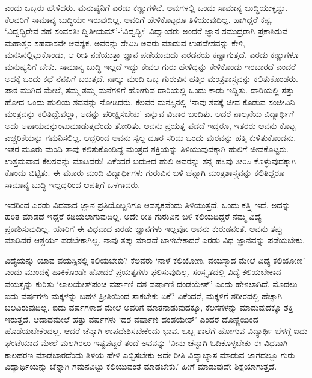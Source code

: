 ಎಂದು ಒಬ್ಬರು ಹೇಳಿದರು. 
ಮನುಷ್ಯನಿಗೆ ಎರಡು 
ಕಣ್ಣುಗಳಿವೆ. ಅವುಗಳಲ್ಲಿ 
ಒಂದು ಸಾಮಾನ್ಯ 
ಬುದ್ಧಿಯುಳ್ಳದ್ದು. ಕೆಲವರಿಗೆ 
ಸಾಮಾನ್ಯ ಬುದ್ಧಿಯೇ 
ಇರುವುದಿಲ್ಲ. ಅವರಿಗೆ 
ಹೇಳಿಕೊಟ್ಟರೂ 
ತಿಳಿಯುವುದಿಲ್ಲ. ಹಾಗಿದ್ದರೆ 
ಕಷ್ಟ. `ವಿದ್ವದ್ಭಿರೇವ ಸಹ 
ಸಂವಸತಿಃ 
ದ್ವಿತೀಯಮ್'-`ವಿದ್ವದ್ಭಿಃ' 
ವಿದ್ವಾಂಸರು ಅಂದರೆ ಜ್ಞಾನ 
ಸಮುದ್ರರಾಗಿ ಪ್ರಕಾಶಿಸುವ 
ಮಹಾತ್ಮರ ಸಹವಾಸವೇ ಆವಶ್ಯಕ. 
ಅವರನ್ನು ಸೇವಿಸಿ ಅವರು ಮಾಡುವ 
ಉಪದೇಶವನ್ನು ಕೇಳಿ, 
ಮನಸಿನಲ್ಲಿಟ್ಟುಕೊಂಡು, ಆ 
ರೀತಿ ನಡೆಯುತ್ತಾ ಜ್ಞಾನ 
ಪಡೆಯುವುದು ಎರಡನೆಯ 
ಕಣ್ಣಾಗುತ್ತದೆ. ಎರಡು 
ಕಣ್ಣುಗಳೂ ಮನುಷ್ಯನಿಗೆ ಬೇಕು. 
ಸಾಮಾನ್ಯ ಬುದ್ಧಿ ಇಲ್ಲದೆ 
ಇದ್ದು ಕೇವಲ ಗುರು 
ಹೇಳಿದ್ದನ್ನು ಕೇಳಿಕೊಂಡು 
ಇರಬಾರದೆ ಎಂದರೆ ಅದಕ್ಕೆ ಒಂದು 
ಕಥೆ ನೆನಪಿಗೆ ಬರುತ್ತದೆ. 
ನಾಲ್ಕು ಮಂದಿ ಒಬ್ಬ ಗುರುವಿನ 
ಹತ್ತಿರ ಮಂತ್ರಶಾಸ್ತ್ರವನ್ನು 
ಕಲಿತುಕೊಂಡರು. ಪಾಠ ಮುಗಿದ 
ಮೇಲೆ, ತಮ್ಮ ತಮ್ಮ ಮನೆಗಳಿಗೆ 
ಹೋಗುವ ದಾರಿಯಲ್ಲಿ ಒಂದು ಕಾಡು 
ಇದ್ದಿತು. ದಾರಿಯಲ್ಲಿ ಸತ್ತು 
ಹೋದ ಒಂದು ಹುಲಿಯ ಶವವನ್ನು 
ನೋಡಿದರು. ಕೆಲವರ 
ಮನಸ್ಸಿನಲ್ಲಿ `ನಾವು ಶವಕ್ಕೆ 
ಜೀವ ಕೊಡುವ ಸಂಜೀವಿನಿ 
ಮಂತ್ರವನ್ನು 
ಕಲಿತಿದ್ದೇವಲ್ಲಾ, ಅದನ್ನು 
ಪರೀಕ್ಷಿಸಬೇಕು' ಎನ್ನುವ 
ವಿಚಾರ ಬಂದಿತು. ಆದರೆ 
ನಾಲ್ಕನೆಯ ವಿದ್ಯಾರ್ಥಿಗೆ ಅದು 
ಅಪಾಯವನ್ನುಂಟುಮಾಡುತ್ತದೆಂದು ತೋರಿತು. ಅವನು ಪ್ರಯತ್ನ ಪಡದೆ ಇದ್ದರೂ, ಇತರರು ಅವನು ಕೊಟ್ಟ ಎಚ್ಚರಿಕೆಯನ್ನು ಗಮನಿಸಲಿಲ್ಲ. ಆದ್ದರಿಂದ ಅವನು ಸ್ವಲ್ಪ ದೂರ ಸರಿದು ಒಂದು ಮರವನ್ನು ಹತ್ತಿ ಕುಳಿತುಕೊಂಡನು. ಇತರ ಮೂರು ಮಂದಿ ತಾವು ಕಲಿತುಕೊಂಡಿದ್ದ ಮಂತ್ರದ ಶಕ್ತಿಯನ್ನು ತಿಳಿಯುವುದಕ್ಕಾಗಿ ಹುಲಿಗೆ ಜೀವಕೊಟ್ಟರು. ಉತ್ತಮವಾದ ಕೆಲಸವನ್ನು ಮಾಡಿದರು! ಏಕೆಂದರೆ ಬದುಕಿದ ಹುಲಿ ಅವರನ್ನು ತನ್ನ ಹಸಿವು ತೀರಿಸಿ ಕೊಳ್ಳುವುದಕ್ಕಾಗಿ ಕೊಂದು ಬಿಟ್ಟಿತು. ಈ ಮೂರು ಮಂದಿ ವಿದ್ಯಾರ್ಥಿಗಳು ಗುರುವಿನ ಬಳಿ ಚೆನ್ನಾಗಿ ಮಂತ್ರಶಾಸ್ತ್ರವನ್ನು ಕಲಿತಿದ್ದರೂ ಸಾಮಾನ್ಯ ಬುದ್ಧಿ ಇಲ್ಲದ್ದರಿಂದ ಆಪತ್ತಿಗೆ ಒಳಗಾದರು. 

ಇದರಿಂದ ಎರಡು ವಿಧವಾದ ಜ್ಞಾನ 
ಪ್ರತಿಯೊಬ್ಬನಿಗೂ 
ಆವಶ್ಯಕವೆಂದು ತಿಳಿಯುತ್ತದೆ. 
ಒಂದು ಕತ್ತ್ತಿ ಇದೆ. ಅದನ್ನು 
ಹರಿತ ಮಾಡದೆ ಇದ್ದರೆ 
ಕಡಿಯಲಾಗುವುದಿಲ್ಲ. ಅದೇ ರೀತಿ 
ಗುರುವಿನ ಬಳಿ ಕಲಿಯದಿದ್ದರೆ 
ನಮ್ಮ ವಿದ್ಯೆ 
ಪ್ರಕಾಶಿಸುವುದಿಲ್ಲ. ಯಾರಿಗೆ 
ಈ ವಿಧವಾದ ಎರಡು ಜ್ಞಾನಗಳು 
ಇಲ್ಲವೋ ಅವನು ಕುರುಡನಂತೆ. 
ಅವನು ತಪ್ಪು ಮಾಡಿದರೆ 
ಆಶ್ಚರ್ಯ ಪಡಬೇಕಾಗಿಲ್ಲ. ನಾವು 
ತಪ್ಪು ಮಾಡದೆ ಬಾಳಬೇಕಾದರೆ ಎರಡು ವಿಧ ಜ್ಞಾನವನ್ನು ಪಡೆಯಬೇಕು.

ವಿದ್ಯೆಯನ್ನು ಯಾವ 
ವಯಸ್ಸಿನಲ್ಲಿ ಕಲಿಯಬೇಕು? 
ಕೆಲವರು `ನಾಳೆ ಕಲಿಯೋಣ, 
ವಯಸ್ಸಾದ ಮೇಲೆ ವಿದ್ಯೆ 
ಕಲಿಯೋಣ' ಎಂದು ಮುಂದಕ್ಕೆ 
ಹಾಕಿಕೊಂಡೇ ಹೋದರೆ 
ಪ್ರಯತ್ನಗಳು ಫಲಿಸುವುದಿಲ್ಲ. 
ಸಂಸ್ಕೃತದಲ್ಲಿ ವಿದ್ಯೆ 
ಕಲಿಯಬೇಕಾದ ವಯಸ್ಸನ್ನು 
ಕುರಿತು `ಲಾಲಯೇತ್‌ಪಂಚ 
ವರ್ಷಾಣಿ ದಶ ವರ್ಷಾಣಿ 
ದಂಡಯೇತ್' ಎಂದು ಹೇಳಲಾಗಿದೆ. 
ಮೊದಲು ಐದು ವರ್ಷಗಳು 
ಮಕ್ಕಳನ್ನು ಬಹಳ ಪ್ರೀತಿಯಿಂದ 
ಸಾಕಬೇಕು ಏಕೆ? ಏಕೆಂದರೆ, 
ಮಕ್ಕಳಿಗೆ ಶರೀರದಲ್ಲಿ 
ಹೆಚ್ಚಾಗಿ ಬಲವಿರುವುದಿಲ್ಲ. 
ಐದು ವರ್ಷಗಳಾದ ಮೇಲೆ ಅವರಿಗೆ 
ಮಾತನಾಡುವುದಕ್ಕೂ, 
ಕೆಲಸಗಳನ್ನು ಮಾಡುವುದಕ್ಕೂ 
ಶಕ್ತಿ ಇರುತ್ತದೆ. ಆದಾದಮೇಲೆ 
ಹತ್ತು ವರ್ಷಗಳು `ದಶ ವರ್ಷಾಣಿ 
ದಂಡಯೇತ್' ಎಂದರೆ ದೊಣ್ಣೆಯಿಂದ 
ಹೊಡೆಯಬೇಕೆಂದಲ್ಲ. ಆದರೆ 
ಚೆನ್ನಾಗಿ ಉಪದೇಶಿಸಬೇಕೆಂದು 
ಭಾವ. ಒಬ್ಬ ಶಾಲೆಗೆ ಹೋಗುವ 
ವಿದ್ಯಾರ್ಥಿ ಬೆಳಗ್ಗೆ ಐದು 
ಘಂಟೆಯಾದ ಮೇಲೆ ಮಲಗಿರಲು 
ಇಷ್ಟಪಟ್ಟರೆ ತಂದೆ ಅವನನ್ನು 
`ನೀನು ಚೆನ್ನಾಗಿ 
ಓದಿಕೊಳ್ಳಬೇಕು ಈ ವಿಧವಾಗಿ 
ಕಾಲಹರಣ ಮಾಡಬಾರದೆಂದು ತಿಳಿಯ 
ಹೇಳಿ ಎಬ್ಬಿಸಬೇಕು ಅದೇ ರೀತಿ 
ವಿದ್ಯಾಬ್ಯಾಸ ಮಾಡುವ 
ಜಾಗದಲ್ಲೂ ಗುರು 
ವಿದ್ಯಾರ್ಥಿಯನ್ನು ಚೆನ್ನಾಗಿ 
ಗಮನವಿಟ್ಟು ಕಲಿಯುವಂತೆ ಮಾಡಬೇಕು.' ಹೀಗೆ ಮಾಡುವುದೇ ಶಿಕ್ಷೆಯಾಗುತ್ತದೆ.    


